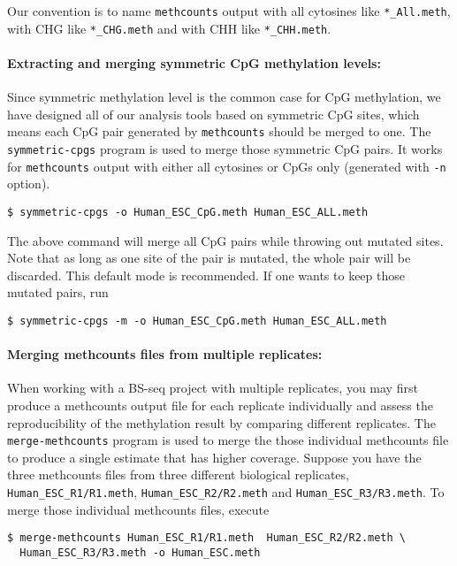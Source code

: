 \documentclass[10pt]{article}
\newcommand{\prog}[1]{\texttt{#1}}
\newcommand{\fn}[1]{\texttt{#1}}
\begin{document}
Our convention is to name \prog{methcounts} output with all cytosines
like \fn{*\_All.meth}, with CHG like \fn{*\_CHG.meth} and
with CHH like \fn{*\_CHH.meth}.

\paragraph{Extracting and merging symmetric CpG methylation levels:}
\label{sec:symmetric-cpg}
Since symmetric methylation level is the common case for CpG methylation,
we have designed all of our analysis tools based on symmetric CpG sites, 
which means each CpG pair generated by \prog{methcounts} should be
merged to one. The \prog{symmetric-cpgs} program is used to merge those
symmetric CpG pairs. It works for \prog{methcounts} output with either
all cytosines or CpGs only (generated with \texttt{-n} option).

\begin{verbatim}
$ symmetric-cpgs -o Human_ESC_CpG.meth Human_ESC_ALL.meth
\end{verbatim}

The above command will merge all CpG pairs while throwing out mutated sites.
Note that as long as one site of the pair is mutated, the whole pair will
be discarded. This default mode is recommended. If one wants to keep 
those mutated pairs, run

\begin{verbatim}
$ symmetric-cpgs -m -o Human_ESC_CpG.meth Human_ESC_ALL.meth
\end{verbatim}

\paragraph{Merging methcounts files from multiple replicates:}
\label{sec:merg-methc-file} 
When working with a BS-seq project with multiple replicates, you may
first produce a methcounts output file for each replicate individually
and assess the reproducibility of the methylation result by comparing
different replicates. The \prog{merge-methcounts} program is used to
merge the those individual methcounts file to produce a single
estimate that has higher coverage. Suppose you have the three
methcounts files from three different biological replicates,
\fn{Human\_ESC\_R1/R1.meth}, \fn{Human\_ESC\_R2/R2.meth} and
\fn{Human\_ESC\_R3/R3.meth}. To merge those individual methcounts files,
execute
\begin{verbatim}
$ merge-methcounts Human_ESC_R1/R1.meth  Human_ESC_R2/R2.meth \
  Human_ESC_R3/R3.meth -o Human_ESC.meth
\end{verbatim}
\end{document}
